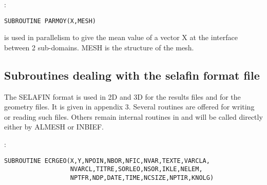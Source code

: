 :
\begin{lstlisting}[language=TelFortran]
SUBROUTINE PARMOY(X,MESH)
\end{lstlisting}

 is used in parallelism to give the mean value of a vector X at
the interface between 2 sub-domains. MESH is the  structure
of the mesh.

\subsection{Subroutines dealing with the selafin format file}
The SELAFIN format is used in 2D and 3D for the results files and for the
geometry files. It is given in appendix 3. Several routines are offered for
writing or reading such files. Others remain internal routines in \bief and will
be called directly either by ALMESH or INBIEF.

:
\begin{lstlisting}[language=TelFortran]
SUBROUTINE ECRGEO(X,Y,NPOIN,NBOR,NFIC,NVAR,TEXTE,VARCLA,
                  NVARCL,TITRE,SORLEO,NSOR,IKLE,NELEM,
                  NPTFR,NDP,DATE,TIME,NCSIZE,NPTIR,KNOLG)
\end{lstlisting}

